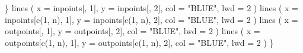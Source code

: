 \documentclass[
  12pt,
  letterpaper,
  DIV=11,
  numbers=noendperiod]{scrreprt}
\newenvironment{Shaded}{\begin{snugshade}}{\end{snugshade}}
\newcommand{\AttributeTok}[1]{\textcolor[rgb]{0.40,0.45,0.13}{#1}}
\newcommand{\DecValTok}[1]{\textcolor[rgb]{0.68,0.00,0.00}{#1}}
\newcommand{\FunctionTok}[1]{\textcolor[rgb]{0.28,0.35,0.67}{#1}}
\newcommand{\NormalTok}[1]{\textcolor[rgb]{0.00,0.23,0.31}{#1}}
\newcommand{\StringTok}[1]{\textcolor[rgb]{0.13,0.47,0.30}{#1}}
\theoremstyle{remark}
\begin{document}
\begin{Shaded}
\begin{Highlighting}[]
\NormalTok{  \}}
  \FunctionTok{lines}\NormalTok{ (}
    \AttributeTok{x =}\NormalTok{ inpoints[, }\DecValTok{1}\NormalTok{],}
    \AttributeTok{y =}\NormalTok{ inpoints[, }\DecValTok{2}\NormalTok{],}
    \AttributeTok{col =} \StringTok{"BLUE"}\NormalTok{,}
    \AttributeTok{lwd =} \DecValTok{2}
\NormalTok{  )}
  \FunctionTok{lines}\NormalTok{ (}
    \AttributeTok{x =}\NormalTok{ inpoints[}\FunctionTok{c}\NormalTok{(}\DecValTok{1}\NormalTok{, n), }\DecValTok{1}\NormalTok{],}
    \AttributeTok{y =}\NormalTok{ inpoints[}\FunctionTok{c}\NormalTok{(}\DecValTok{1}\NormalTok{, n), }\DecValTok{2}\NormalTok{],}
    \AttributeTok{col =} \StringTok{"BLUE"}\NormalTok{,}
    \AttributeTok{lwd =} \DecValTok{2}
\NormalTok{  )}
  \FunctionTok{lines}\NormalTok{ (}
    \AttributeTok{x =}\NormalTok{ outpoints[, }\DecValTok{1}\NormalTok{],}
    \AttributeTok{y =}\NormalTok{ outpoints[, }\DecValTok{2}\NormalTok{],}
    \AttributeTok{col =} \StringTok{"BLUE"}\NormalTok{,}
    \AttributeTok{lwd =} \DecValTok{2}
\NormalTok{  )}
  \FunctionTok{lines}\NormalTok{ (}
    \AttributeTok{x =}\NormalTok{ outpoints[}\FunctionTok{c}\NormalTok{(}\DecValTok{1}\NormalTok{, n), }\DecValTok{1}\NormalTok{],}
    \AttributeTok{y =}\NormalTok{ outpoints[}\FunctionTok{c}\NormalTok{(}\DecValTok{1}\NormalTok{, n), }\DecValTok{2}\NormalTok{],}
    \AttributeTok{col =} \StringTok{"BLUE"}\NormalTok{,}
    \AttributeTok{lwd =} \DecValTok{2}
\NormalTok{  )}
\NormalTok{\}}



\end{Highlighting}
\end{Shaded}
\end{document}
